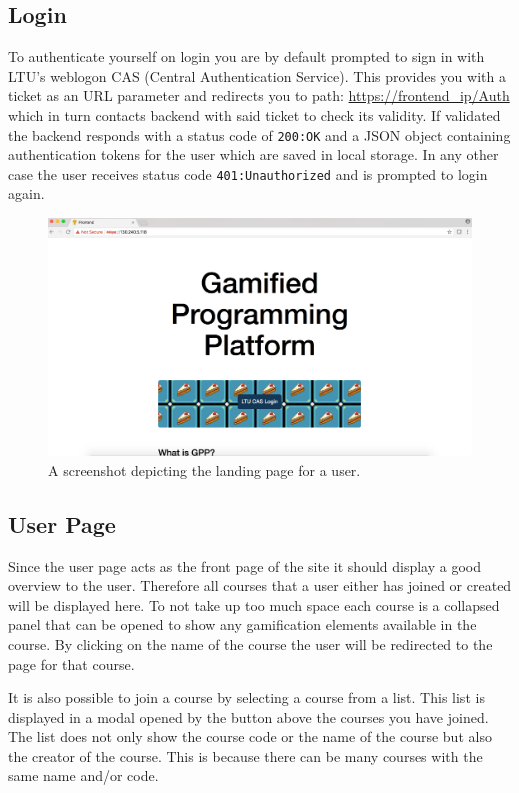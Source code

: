 \subsection{Login}
To authenticate yourself on login you are by default prompted to sign in with LTU's weblogon CAS (Central Authentication Service). 
This provides you with a ticket as an URL parameter and redirects you to path: \url{https://frontend\_ip/Auth} which in turn contacts backend with said ticket to check its validity. If validated the backend responds with a status code of \texttt{200:\@ OK} and a JSON object containing authentication tokens for the user which are saved in local storage. In any other case the user receives status code \texttt{401:\@ Unauthorized} and is prompted to login again.
\begin{figure}[H]
    \centering
    \includegraphics[width=.45\textwidth]{img/gppinpictures/login2.png}
    \caption{A screenshot depicting the landing page for a user.}
    \label{fig:student}
\end{figure}

\subsection{User Page}
Since the user page acts as the front page of the site it should display a good overview to the user. Therefore all courses that a user either has joined or created will be displayed here. To not take up too much space each course is a collapsed panel that can be opened to show any gamification elements available in the course. By clicking on the name of the course the user will be redirected to the page for that course.

It is also possible to join a course by selecting a course from a list. This list is displayed in a modal opened by the button above the courses you have joined.  The list does not only show the course code or the name of the course but also the creator of the course. This is because there can be many courses with the same name and/or code.

